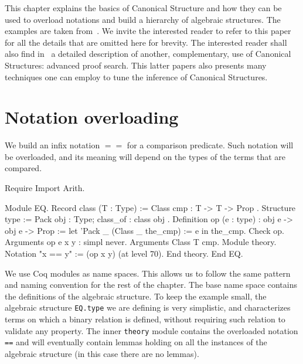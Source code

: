 
\label{CS-full}

\noindent This chapter explains the basics of Canonical Structure and how they can be used
to overload notations and build a hierarchy of algebraic structures.
The examples are taken from~\cite{CSwcu}.  We invite the interested reader
to refer to this paper for all the details that are omitted here for brevity.
The interested reader shall also find in~\cite{CSlessadhoc} a detailed
description of another, complementary, use of Canonical Structures:
advanced proof search.  This latter papers also presents many techniques one
can employ to tune the inference of Canonical Structures.

\section{Notation overloading}

We build an infix notation $==$ for a comparison predicate.  Such notation
will be overloaded, and its meaning will depend on the types of the terms
that are compared.

\begin{coq_eval}
Require Import Arith.
\end{coq_eval}

\begin{coq_example}
Module EQ.
  Record class (T : Type) := Class { cmp : T -> T -> Prop }.
  Structure type := Pack { obj : Type; class_of : class obj }.
  Definition op (e : type) : obj e -> obj e -> Prop :=
    let 'Pack _ (Class _ the_cmp) := e in the_cmp.
  Check op.
  Arguments op {e} x y : simpl never.
  Arguments Class {T} cmp.
  Module theory.
    Notation "x == y" := (op x y) (at level 70).
  End theory.
End EQ.
\end{coq_example}

We use Coq modules as name spaces.  This allows us to follow the same pattern
and naming convention for the rest of the chapter.  The base name space
contains the definitions of the algebraic structure.  To keep the example
small, the algebraic structure \texttt{EQ.type} we are defining is very simplistic,
and characterizes terms on which a binary relation is defined, without
requiring such relation to validate any property.
The inner \texttt{theory} module contains the overloaded notation \texttt{==} and
will eventually contain lemmas holding on all the instances of the
algebraic structure (in this case there are no lemmas).

